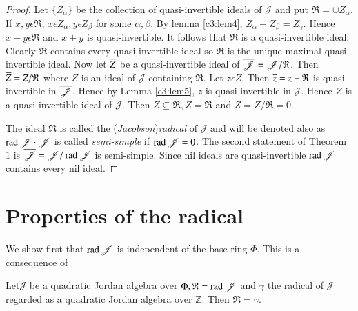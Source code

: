 \begin{proof}
Let $\{Z_{\alpha}\}$ be the collection of quasi-invertible
ideals of $\mathscr{J}$ and put
$\mathfrak{R}=\cup Z_{\alpha}$. If $x,y\epsilon
\mathfrak{R}$, $x\epsilon Z_{\alpha},y\epsilon
Z_{\beta}$ for some $\alpha, \beta$. By lemma \ref{c3:lem4},
$Z_{\alpha}+Z_{\beta}=Z_{\gamma}$. Hence
$x+y\epsilon \mathfrak{R}$ and $x+y$ is quasi-invertible. It follows
that $\mathfrak{R}$ is a quasi-invertible ideal. Clearly
$\mathfrak{R}$ contains every quasi-invertible ideal so $\mathfrak{R}$
is the unique maximal quasi-invertible ideal. Now let
$\overline{Z}$ be a quasi-invertible ideal of
$\overline{\mathscr{J}}=\mathscr{J}/\mathfrak{R}$. Then
$\overline{Z}=Z/\mathfrak{R}$ where $Z$ is
an ideal of $\mathscr{J}$ containing $\mathfrak{R}$. Let $z\epsilon
Z$. Then $\overline{z}=z+\mathfrak{R}$ is quasi invertible in
$\overline{\mathscr{J}}$. Hence by Lemma \ref{c3:lem5}, $z$ is quasi-invertible in
$\mathscr{J}$. Hence $Z$ is a quasi-invertible ideal of
$\mathscr{J}$. Then $Z\subseteq \mathfrak{R},
Z=\mathfrak{R}$ and
$Z=Z/\mathfrak{R}=0$.

The ideal $\mathfrak{R}$ is called the ({\em Jacobson}){\em radical}
of $\mathscr{J}$ and will be denoted also as $\operatorname{rad}
\mathscr{J}\cdot\mathscr{J}$ is called {\em semi-simple} if $\operatorname{rad}
\mathscr{J}=0$. The second statement of Theorem $1$ is
$\overline{\mathscr{J}}=\mathscr{J}/\operatorname{rad} \mathscr{J}$ is semi-simple. Since
nil ideals are quasi-invertible $\operatorname{rad} \mathscr{J}$ contains every nil
ideal.
\end{proof}

\section{Properties of the radical}\label{c3:sec2}

We show first that $\operatorname{rad} \mathscr{J}$ is independent of the base ring
$\Phi$. This is a consequence of

\begin{thm}\label{c3:thm2}
Let\pageoriginale $\mathscr{J}$ be a quadratic Jordan algebra over
$\Phi,\mathfrak{R}=\operatorname{rad}\mathscr{J}$ and $\gamma$ the radical of
$\mathscr{J}$ regarded as a quadratic Jordan algebra over
$\mathbb{Z}$. Then $\mathfrak{R}=\gamma$.
\end{thm}

